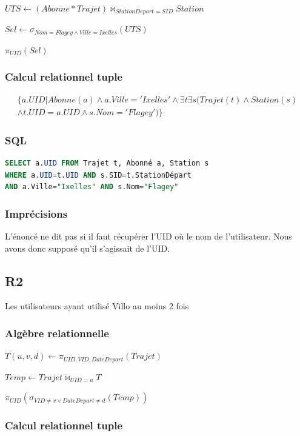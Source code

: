 \documentclass[a4paper, 12pt]{report}
\begin{document}
$UTS\leftarrow (Abonne * Trajet)\bowtie_{StationDepart=SID} Station$

$Sel\leftarrow \sigma_{Nom=Flagey\wedge Ville=Ixelles}(UTS)$

$\pi_{UID}(Sel)$

\subsubsection*{Calcul relationnel tuple}

\begin{multline*}
\{  a.UID | Abonne(a)\wedge a.Ville='Ixelles' \wedge \exists t \exists s ( Trajet(t)\wedge Station(s) \\\wedge t.UID=a.UID \wedge s.Nom='Flagey')   \} 
\end{multline*}

\subsubsection*{SQL}
\begin{lstlisting}[language=sql]
SELECT a.UID FROM Trajet t, Abonné a, Station s 
WHERE a.UID=t.UID AND s.SID=t.StationDépart
AND a.Ville="Ixelles" AND s.Nom="Flagey"
\end{lstlisting}

\subsubsection*{Imprécisions}

L'énoncé ne dit pas si il faut récupérer l'UID où le nom de l'utilisateur. Nous avons donc supposé qu'il s'agissait de l'UID.

\subsection*{R2}

Les utilisateurs ayant utilisé Villo au moins 2 fois
\subsubsection*{Algèbre relationnelle}

$T(u,v,d) \leftarrow\pi_{UID,VID,DateDepart}(Trajet)$

$Temp\leftarrow Trajet\bowtie_{UID=u}T $

$\pi_{UID}( \sigma_{VID\neq v\vee DateDepart\neq d}(Temp)  )$

\subsubsection*{Calcul relationnel tuple}
\end{document}
